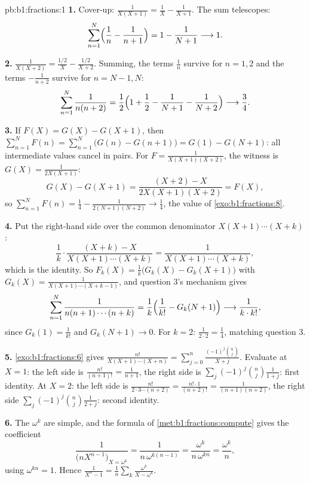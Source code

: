 \begin{solution}{pb:b1:fractions:1}
\textbf{1.} Cover-up: $\frac1{X(X+1)} = \frac1X - \frac1{X+1}$.
The sum telescopes:
\[
\sum_{n=1}^{N}\Bigl(\frac1n - \frac1{n+1}\Bigr)
= 1 - \frac1{N+1} \longrightarrow 1 .
\]

\textbf{2.} $\frac1{X(X+2)} = \frac{1/2}X - \frac{1/2}{X+2}$.
Summing, the terms $\frac1n$ survive for $n = 1, 2$ and the terms
$-\frac1{n+2}$ survive for $n = N-1, N$:
\[
\sum_{n=1}^{N}\frac1{n(n+2)}
= \frac12\Bigl(1 + \frac12 - \frac1{N+1} - \frac1{N+2}\Bigr)
\longrightarrow \frac34 .
\]

\textbf{3.} If $F(X) = G(X) - G(X+1)$, then $\sum_{n=1}^N F(n) =
\sum_{n=1}^N\bigl(G(n) - G(n+1)\bigr) = G(1) - G(N+1)$: all
intermediate values cancel in pairs. For $F =
\frac1{X(X+1)(X+2)}$, the witness is $G(X) = \frac1{2X(X+1)}$:
\[
G(X) - G(X+1)
= \frac{(X+2) - X}{2X(X+1)(X+2)} = F(X) ,
\]
so $\sum_{n=1}^N F(n) = \frac14 - \frac1{2(N+1)(N+2)} \to
\frac14$, the value of \cref{exo:b1:fractions:8}.

\textbf{4.} Put the right-hand side over the common denominator
$X(X+1)\cdots(X+k)$:
\[
\frac1k\cdot\frac{(X + k) - X}{X(X+1)\cdots(X+k)}
= \frac{1}{X(X+1)\cdots(X+k)} ,
\]
which is the identity. So $F_k(X) = \frac1k\bigl(G_k(X) -
G_k(X+1)\bigr)$ with $G_k(X) = \frac1{X(X+1)\cdots(X+k-1)}$, and
question 3's mechanism gives
\[
\sum_{n=1}^{N}\frac1{n(n+1)\cdots(n+k)}
= \frac1k\Bigl(\frac1{k!} - G_k(N+1)\Bigr)
\longrightarrow \frac1{k\cdot k!} ,
\]
since $G_k(1) = \frac1{k!}$ and $G_k(N+1) \to 0$. For $k = 2$:
$\frac1{2\cdot2} = \frac14$, matching question 3.

\textbf{5.} \cref{exo:b1:fractions:6} gives
$\frac{n!}{X(X+1)\cdots(X+n)} = \sum_{j=0}^n
\frac{(-1)^j\binom nj}{X + j}$. Evaluate at $X = 1$: the left side
is $\frac{n!}{(n+1)!} = \frac1{n+1}$, the right side is
$\sum_j(-1)^j\binom nj\frac1{1+j}$: first identity. At $X = 2$:
the left side is $\frac{n!}{2\cdot3\cdots(n+2)} =
\frac{n!\cdot1}{(n+2)!} = \frac1{(n+1)(n+2)}$, the right side
$\sum_j(-1)^j\binom nj\frac1{2+j}$: second identity.

\textbf{6.} The  $\omega^k$ are simple, and the 
formula of \cref{met:b1:fractions:compute} gives the coefficient
\[
\frac{1}{\bigl(nX^{n-1}\bigr)_{X = \omega^k}}
= \frac{1}{n\,\omega^{k(n-1)}}
= \frac{\omega^k}{n\,\omega^{kn}} = \frac{\omega^k}n ,
\]
using $\omega^{kn} = 1$. Hence $\frac1{X^n-1} = \frac1n\sum_k
\frac{\omega^k}{X - \omega^k}$.


\end{solution}
